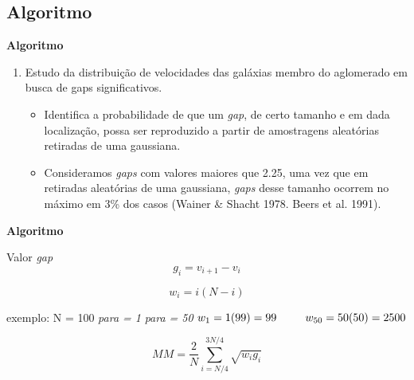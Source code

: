 \documentclass[xcolor=dvipsnames,10pt]{beamer}
\begin{document}
\subsection{Algoritmo}
\begin{frame}{\textbf{Algoritmo}}
  \begin{enumerate}
    \item Estudo da distribuição de velocidades das galáxias membro do aglomerado em busca de gaps significativos.
    \begin{itemize}
      \item Identifica a probabilidade de que um \textit{gap}, de certo tamanho e em dada localização, possa ser reproduzido a partir de amostragens aleatórias retiradas de uma gaussiana.
      \item Consideramos \textit{gaps} com valores maiores que 2.25, uma vez que em retiradas aleatórias de uma gaussiana, \textit{gaps} desse tamanho ocorrem no máximo em 3\% dos casos (Wainer \& Shacht 1978. Beers et al. 1991).
    \end{itemize}
  \end{enumerate}
\end{frame}

\begin{frame}{\textbf{Algoritmo}}
  \begin{block}{Valor \textit{gap}}
  \begin{equation}
    g_i = v_{i+1} - v_i
  \end{equation}
  \begin{center}
  \begin{equation}
    w_i=i(N-i)
  \end{equation}
  \begin{center}
  		\hspace{10 ex} exemplo: N = 100\newline
    	\textit{para = 1} \hspace{15 ex}  \textit{para = 50}\newline
    	$w_1 = 1(99) = 99 \hspace{6 ex} w_{50} = 50(50) = 2500$
  \end{center}
  \end{center}
  \begin{equation}
    MM = \frac{2}{N} \sum_{i=N/4}^{3N/4} \sqrt{w_i g_i}
  \end{equation}
  \end{block}
\end{frame}
\end{document}
